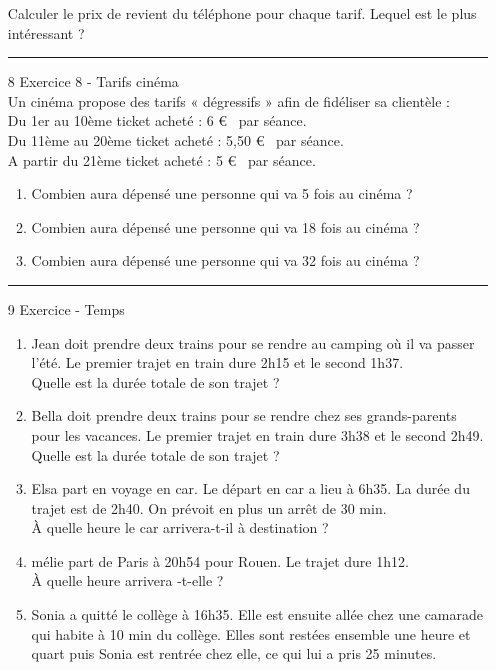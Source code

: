 \documentclass[11pt]{article}
\begin{document}
\begin{multicols}{2}
\begin{enumerate}
  Calculer le prix de revient du téléphone pour chaque tarif. Lequel est le plus intéressant ?\\
\rule{\linewidth}{0.5pt}
\item[8] Exercice 8 - Tarifs cinéma\\
  Un cinéma propose des tarifs « dégressifs » afin de fidéliser sa clientèle :\\
  Du 1er au 10ème ticket acheté : 6 \euro~ par séance.\\
  Du 11ème au 20ème ticket acheté : 5,50 \euro~ par séance.\\
  A partir du 21ème ticket acheté : 5 \euro~ par séance.
  \begin{enumerate}
  \item Combien aura dépensé une personne qui va 5 fois au cinéma ?
  \item Combien aura dépensé une personne qui va 18 fois au cinéma ?
  \item Combien aura dépensé une personne qui va 32 fois au cinéma ?
  \end{enumerate}
\rule{\linewidth}{0.5pt}
\item[9] Exercice - Temps\\
  \begin{enumerate}
  \item Jean doit prendre deux trains pour se rendre au camping où il va passer l'été. Le premier trajet en train dure 2h15 et le second 1h37. \\
    Quelle est la durée totale de son trajet ?
  \item Bella doit prendre deux trains pour se rendre chez ses grands-parents pour les vacances. Le premier trajet en train dure 3h38 et le second 2h49. \\
    Quelle est la durée totale de son trajet ?
  \item Elsa part en voyage en car. Le départ en car a lieu à 6h35. La durée du trajet est de 2h40. On prévoit en plus un arrêt de 30 min. \\
    À quelle heure le car arrivera-t-il à destination ? 
  \item mélie part de Paris à 20h54 pour Rouen. Le trajet dure 1h12. \\
    À quelle heure arrivera -t-elle ?
  \item Sonia a quitté le collège à 16h35. Elle est ensuite allée chez une camarade qui habite à 10 min du collège. Elles sont restées ensemble une heure et quart puis Sonia est rentrée chez elle, ce qui lui a pris 25 minutes. \\

\end{enumerate}
\end{enumerate}
\end{multicols}
\end{document}
